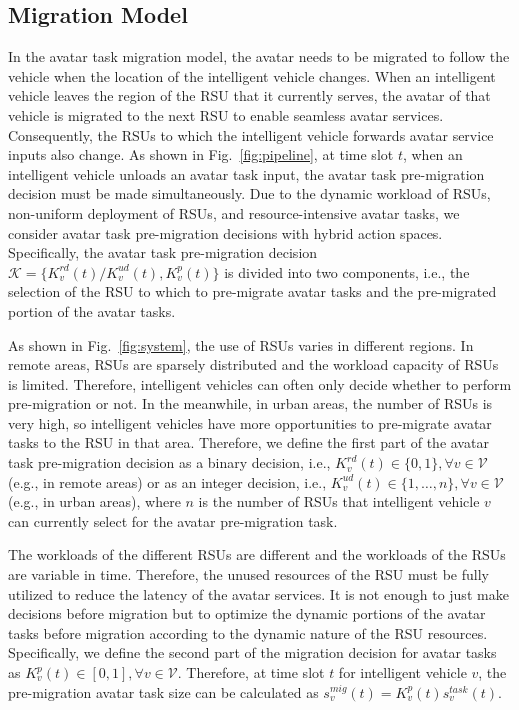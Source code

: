 \documentclass[lettersize,journal]{IEEEtran}
\begin{document}
\subsection{Migration Model}
In the avatar task migration model, the avatar needs to be migrated to follow the vehicle when the location of the intelligent vehicle changes. When an intelligent vehicle leaves the region of the RSU that it currently serves, the avatar of that vehicle is migrated to the next RSU to enable seamless avatar services. Consequently, the RSUs to which the intelligent vehicle forwards avatar service inputs also change.  As shown in Fig.~\ref{fig:pipeline}, at time slot $t$, when an intelligent vehicle unloads an avatar task input, the avatar task pre-migration decision must be made simultaneously. Due to the dynamic workload of RSUs, non-uniform deployment of RSUs, and resource-intensive avatar tasks, we consider avatar task pre-migration decisions with hybrid action spaces. Specifically, the avatar task pre-migration decision $\mathcal{K}=\{K^{rd}_v(t)/K^{ud}_v(t),K^p_v(t)\}$ is divided into two components, i.e., the selection of the RSU to which to pre-migrate avatar tasks and the pre-migrated portion of the avatar tasks.

As shown in Fig.~\ref{fig:system}, the use of RSUs varies in different regions. In remote areas, RSUs are sparsely distributed and the workload capacity of RSUs is limited. Therefore, intelligent vehicles can often only decide whether to perform pre-migration or not. In the meanwhile, in urban areas, the number of RSUs is very high, so intelligent vehicles have more opportunities to pre-migrate avatar tasks to the RSU in that area. Therefore, we define the first part of the avatar task pre-migration decision as a binary decision, i.e., $K^{rd}_v(t)\in\{0,1\},\forall v\in \mathcal{V}$ (e.g., in remote areas) or as an integer decision, i.e., $K^{ud}_v(t)\in\{1,\dots,n\},\forall v\in \mathcal{V}$ (e.g., in urban areas), where $n$ is the number of RSUs that intelligent vehicle $v$ can currently select for the avatar pre-migration task.

The workloads of the different RSUs are different and the workloads of the RSUs are variable in time. Therefore, the unused resources of the RSU must be fully utilized to reduce the latency of the avatar services. It is not enough to just make decisions before migration but to optimize the dynamic portions of the avatar tasks before migration according to the dynamic nature of the RSU resources. Specifically, we define the second part of the migration decision for avatar tasks as $K^p_v(t)\in[0,1],\forall v\in \mathcal{V}$. Therefore, at time slot $t$ for intelligent vehicle $v$, the pre-migration avatar task size can be calculated as $s^{mig}_v(t)= K^p_v(t) s^{task}_v(t)$.
\end{document}
